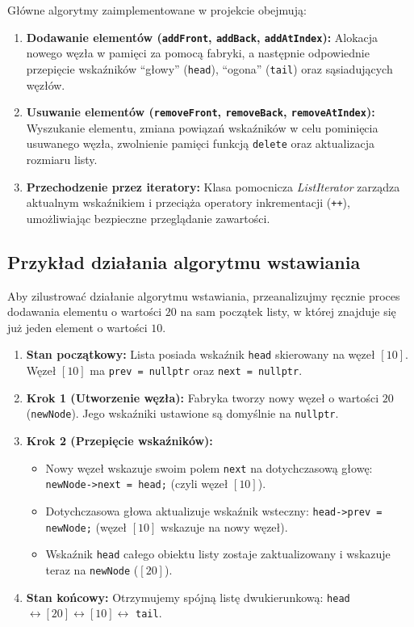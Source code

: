 Główne algorytmy zaimplementowane w projekcie obejmują:
\begin{enumerate}
    \item \textbf{Dodawanie elementów (\texttt{addFront}, \texttt{addBack}, \texttt{addAtIndex}):} Alokacja nowego węzła w pamięci za pomocą fabryki, a następnie odpowiednie przepięcie wskaźników ``głowy'' (\texttt{head}), ``ogona'' (\texttt{tail}) oraz sąsiadujących węzłów.
    \item \textbf{Usuwanie elementów (\texttt{removeFront}, \texttt{removeBack}, \texttt{removeAtIndex}):} Wyszukanie elementu, zmiana powiązań wskaźników w celu pominięcia usuwanego węzła, zwolnienie pamięci funkcją \texttt{delete} oraz aktualizacja rozmiaru listy.
    \item \textbf{Przechodzenie przez iteratory:} Klasa pomocnicza \textit{ListIterator} zarządza aktualnym wskaźnikiem i przeciąża operatory inkrementacji (\texttt{++}), umożliwiając bezpieczne przeglądanie zawartości.
\end{enumerate}

\subsection{Przykład działania algorytmu wstawiania}
Aby zilustrować działanie algorytmu wstawiania, przeanalizujmy ręcznie proces dodawania elementu o wartości $20$ na sam początek listy, w której znajduje się już jeden element o wartości $10$.

\begin{enumerate}
    \item \textbf{Stan początkowy:} 
    Lista posiada wskaźnik \texttt{head} skierowany na węzeł $[10]$. Węzeł $[10]$ ma \texttt{prev = nullptr} oraz \texttt{next = nullptr}.
    
    \item \textbf{Krok 1 (Utworzenie węzła):} 
    Fabryka tworzy nowy węzeł o wartości $20$ (\texttt{newNode}). Jego wskaźniki ustawione są domyślnie na \texttt{nullptr}.
    
    \item \textbf{Krok 2 (Przepięcie wskaźników):} 
    \begin{itemize}
        \item Nowy węzeł wskazuje swoim polem \texttt{next} na dotychczasową głowę: \texttt{newNode->next = head;} (czyli węzeł $[10]$).
        \item Dotychczasowa głowa aktualizuje wskaźnik wsteczny: \texttt{head->prev = newNode;} (węzeł $[10]$ wskazuje na nowy węzeł).
        \item Wskaźnik \texttt{head} całego obiektu listy zostaje zaktualizowany i wskazuje teraz na \texttt{newNode} ($[20]$).
    \end{itemize}
    
    \item \textbf{Stan końcowy:} 
    Otrzymujemy spójną listę dwukierunkową: \texttt{head} $\leftrightarrow [20] \leftrightarrow [10] \leftrightarrow$ \texttt{tail}.
\end{enumerate}

